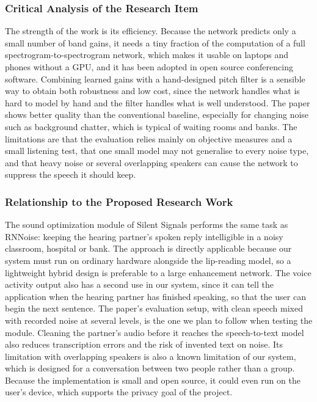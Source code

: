 \documentclass{FastFyp}
\begin{document}
\subsubsection*{Critical Analysis of the Research Item}
The strength of the work is its efficiency. Because the network predicts only a small number of band gains, it needs a tiny fraction of the computation of a full spectrogram-to-spectrogram network, which makes it usable on laptops and phones without a GPU, and it has been adopted in open source conferencing software. Combining learned gains with a hand-designed pitch filter is a sensible way to obtain both robustness and low cost, since the network handles what is hard to model by hand and the filter handles what is well understood. The paper shows better quality than the conventional baseline, especially for changing noise such as background chatter, which is typical of waiting rooms and banks. The limitations are that the evaluation relies mainly on objective measures and a small listening test, that one small model may not generalise to every noise type, and that heavy noise or several overlapping speakers can cause the network to suppress the speech it should keep.

\subsubsection*{Relationship to the Proposed Research Work}
The sound optimization module of Silent Signals performs the same task as RNNoise: keeping the hearing partner's spoken reply intelligible in a noisy classroom, hospital or bank. The approach is directly applicable because our system must run on ordinary hardware alongside the lip-reading model, so a lightweight hybrid design is preferable to a large enhancement network. The voice activity output also has a second use in our system, since it can tell the application when the hearing partner has finished speaking, so that the user can begin the next sentence. The paper's evaluation setup, with clean speech mixed with recorded noise at several levels, is the one we plan to follow when testing the module. Cleaning the partner's audio before it reaches the speech-to-text model also reduces transcription errors and the risk of invented text on noise. Its limitation with overlapping speakers is also a known limitation of our system, which is designed for a conversation between two people rather than a group. Because the implementation is small and open source, it could even run on the user's device, which supports the privacy goal of the project.
\end{document}
